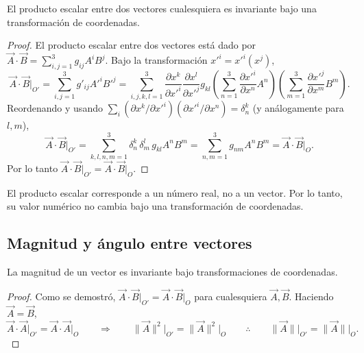 \begin{proposicion}
El producto escalar entre dos vectores cualesquiera es invariante bajo una transformación de coordenadas.
\end{proposicion}

\begin{proof}
El producto escalar entre dos vectores está dado por $\vec A\cdot\vec B = \sum_{i,j=1}^3 g_{ij}A^i B^j$. Bajo la transformación $x'^i=x'^i(x^j)$,
\begin{equation}
\vec A\cdot\vec B\Big|_{O'} = \sum_{i,j=1}^3 g'_{ij}A'^iB'^j
= \sum_{i,j,k,l=1}^3 \frac{\partial x^k}{\partial x'^i}\frac{\partial x^l}{\partial x'^j}g_{kl}
\left(\sum_{n=1}^3\frac{\partial x'^i}{\partial x^n}A^n\right)\!\left(\sum_{m=1}^3\frac{\partial x'^j}{\partial x^m}B^m\right).
\end{equation}
Reordenando y usando $\sum_i (\partial x^k/\partial x'^i)(\partial x'^i/\partial x^n)=\delta^k_n$ (y análogamente para $l,m$),
\begin{equation}
\vec A\cdot\vec B\Big|_{O'} = \sum_{k,l,n,m=1}^3 \delta^k_n\,\delta^l_m\, g_{kl}A^nB^m
= \sum_{n,m=1}^3 g_{nm}A^nB^m = \vec A\cdot\vec B\Big|_O .
\end{equation}
Por lo tanto $\vec A\cdot\vec B\big|_{O'} = \vec A\cdot\vec B\big|_O$.
\end{proof}

\begin{observacion}
El producto escalar corresponde a un número real, no a un vector. Por lo tanto, su valor numérico no cambia bajo una transformación de coordenadas.
\end{observacion}

\subsection{Magnitud y ángulo entre vectores}

\begin{proposicion}
La magnitud de un vector es invariante bajo transformaciones de coordenadas.
\end{proposicion}

\begin{proof}
Como se demostró, $\vec A\cdot\vec B\big|_{O'} = \vec A\cdot\vec B\big|_O$ para cualesquiera $\vec A,\vec B$. Haciendo $\vec A=\vec B$,
\begin{equation}
\vec A\cdot\vec A\Big|_{O'} = \vec A\cdot\vec A\Big|_O
\qquad\Longrightarrow\qquad
\|\vec A\|^2\Big|_{O'} = \|\vec A\|^2\Big|_O
\qquad\therefore\qquad
\|\vec A\|\Big|_{O'} = \|\vec A\|\Big|_O .
\end{equation}
\end{proof}

